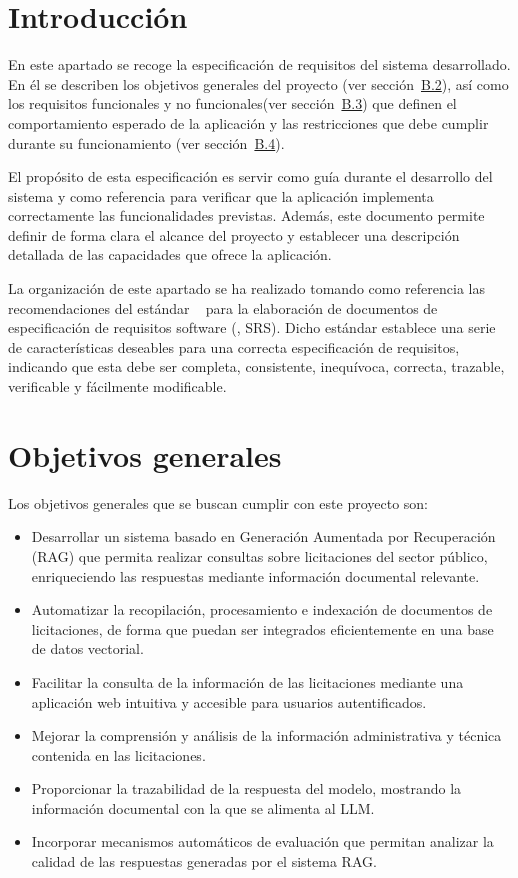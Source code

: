 
\section{Introducción}

En este apartado se recoge la especificación de requisitos del sistema desarrollado. En él se describen los objetivos generales del proyecto (ver sección~\hyperref[req:objgen]{B.2}), así como los requisitos funcionales y no funcionales(ver sección~\hyperref[req:req]{B.3}) que definen el comportamiento esperado de la aplicación y las restricciones que debe cumplir durante su funcionamiento (ver sección~\hyperref[req:esp]{B.4}).

El propósito de esta especificación es servir como guía durante el desarrollo del sistema y como referencia para verificar que la aplicación implementa correctamente las funcionalidades previstas. Además, este documento permite definir de forma clara el alcance del proyecto y establecer una descripción detallada de las capacidades que ofrece la aplicación.

La organización de este apartado se ha realizado tomando como referencia las recomendaciones del estándar ~\cite{req:ieee} para la elaboración de documentos de especificación de requisitos software (, SRS). Dicho estándar establece una serie de características deseables para una correcta especificación de requisitos, indicando que esta debe ser completa, consistente, inequívoca, correcta, trazable, verificable y fácilmente modificable.

\section{Objetivos generales} \label{req:objgen}

Los objetivos generales que se buscan cumplir con este proyecto son:
\begin{itemize}
\tightlist
	\item Desarrollar un sistema basado en Generación Aumentada por Recuperación (RAG) que permita realizar consultas sobre licitaciones del sector público, enriqueciendo las respuestas mediante información documental relevante.
	\item Automatizar la recopilación, procesamiento e indexación de documentos de licitaciones, de forma que puedan ser integrados eficientemente en una base de datos vectorial.
	\item Facilitar la consulta de la información de las licitaciones mediante una aplicación web intuitiva y accesible para usuarios autentificados.
	\item Mejorar la comprensión y análisis de la información administrativa y técnica contenida en las licitaciones.
	\item Proporcionar la trazabilidad de la respuesta del modelo, mostrando la información documental con la que se alimenta al LLM. 
	\item Incorporar mecanismos automáticos de evaluación que permitan analizar la calidad de las respuestas generadas por el sistema RAG.
\end{itemize}


